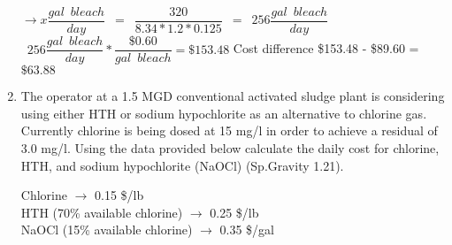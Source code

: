 \begin{enumerate}
\vspace{0.25cm}
$ \rightarrow x \dfrac{gal \enspace bleach}{day}\enspace = \enspace \dfrac{320}{8.34*1.2*0.125} \enspace = \enspace 256 \dfrac{gal \enspace bleach}{day}$\\
\vspace{0.25cm}
$\enspace 256 \dfrac{gal \enspace bleach}{day}*\dfrac{\$0.60}{gal \enspace bleach}=\$153.48$
\vspace{0.25cm}
Cost difference \$153.48 - \$89.60 = $\boxed{\$63.88}$
\vspace{0.25cm}

\item The operator at a 1.5 MGD conventional activated sludge plant is considering using either HTH or sodium hypochlorite as an alternative to chlorine gas. Currently chlorine is being dosed at 15 mg/l in order to achieve a residual of 3.0 mg/l. Using the data provided below calculate the daily cost for chlorine, HTH, and sodium hypochlorite (NaOCl) (Sp.Gravity 1.21).
 
Chlorine $\rightarrow$ 0.15 \$/lb\\
HTH (70\% available chlorine) $\rightarrow$ 0.25 \$/lb\\
NaOCl (15\% available chlorine) $\rightarrow$ 0.35 \$/gal                                                        

\vspace{0.25cm}


\end{enumerate}
